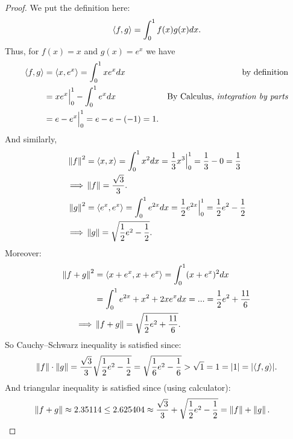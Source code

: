 \begin{proof}
We put the definition here:
\[
    \left< f, g \right> = \int_0^1 f(x)g(x) dx.
\]
Thus, for \(f(x) = x\) and \(g(x) = e^x\) we have
\begin{align*}
    \left< f, g \right> & = \left< x, e^x \right> = \int_0^1 x e^x dx & \text{by definition} \\
    & = xe^x \Big|_0^1 - \int_0^1 e^x dx & \text{By Calculus, \emph{integration by parts}} \\
    & = e - e^x \Big|_0^1 = e - e - (-1) = 1.
\end{align*}
And similarly,
\begin{align*}
    \left\lVert f\right\rVert^2 & = \left< x, x \right> = \int_0^1 x^2 dx
    = \frac{1}{3}x^3 \Big|_0^1
    = \frac{1}{3} - 0 = \frac{1}{3} \\
    \implies & \left\lVert f\right\rVert = \frac{\sqrt{3}}{3}. \\
    \left\lVert g\right\rVert^2 & = \left< e^x, e^x \right> = \int_0^1 e^{2x} dx
    = \frac{1}{2} e^{2x} \Big|_0^1
    = \frac{1}{2} e^2 - \frac{1}{2} \\
    \implies & \left\lVert g\right\rVert = \sqrt{\frac{1}{2} e^2 - \frac{1}{2}}.
\end{align*}
Moreover:
\begin{align*}
    \left\lVert f + g\right\rVert^2 & = \left< x + e^x, x + e^x \right> = \int_0^1 (x + e^x)^2 dx \\
    & = \int_0^1 e^{2x} + x^2 + 2xe^x dx = ... = \frac{1}{2}e^2 + \frac{11}{6} \\
    \implies & \left\lVert f + g\right\rVert = \sqrt{\frac{1}{2}e^2 + \frac{11}{6}}.
\end{align*}
So Cauchy–Schwarz inequality is satisfied since:
\begin{align*}
    \left\lVert f\right\rVert \cdot \left\lVert g\right\rVert = \frac{\sqrt{3}}{3} \sqrt{\frac{1}{2} e^2 - \frac{1}{2}} = \sqrt{\frac{1}{6}e^2 - \frac{1}{6}} > \sqrt{1} = 1 = \lvert1\rvert = \lvert\left< f, g \right>\rvert.
\end{align*}
And triangular inequality is satisfied since (using calculator):
\begin{align*}
    \left\lVert f + g\right\rVert & \approx 2.35114 \le 2.625404 
    \approx \frac{\sqrt{3}}{3} + \sqrt{\frac{1}{2} e^2 - \frac{1}{2}} = \left\lVert f\right\rVert + \left\lVert g\right\rVert.
\end{align*}
\end{proof}

